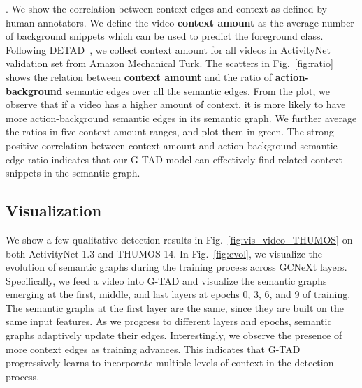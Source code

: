 \documentclass[10pt,twocolumn,letterpaper]{article}
\begin{document}
. We show the correlation between context edges and context as defined by human annotators. 
We define the video \textbf{context amount} as the average number of background snippets which can be used to predict the foreground class. 
Following DETAD~\cite{detad}, we collect context amount for all videos in ActivityNet validation set from Amazon Mechanical Turk. The scatters in Fig.~\ref{fig:ratio} shows the relation between \textbf{context amount} and 
the ratio of \textbf{action-background} semantic edges over all the semantic edges.
From the plot, we observe that if a video has a higher amount of context, it is more likely to have more action-background semantic edges in its semantic graph. We further average the ratios in five context amount ranges, and plot them in green. The strong positive correlation between {context amount} and {action-background semantic edge ratio} indicates that our G-TAD model can effectively find related context snippets in the semantic graph.


















\subsection{Visualization}
We show a few qualitative detection results in Fig.~\ref{fig:vis_video_THUMOS} on both ActivityNet-1.3 and THUMOS-14. In Fig.~\ref{fig:evol}, we visualize the evolution of semantic graphs during the training process across GCNeXt layers. Specifically, we feed a video into G-TAD and visualize the semantic graphs emerging at the first, middle, and last layers at epochs 0, 3, 6, and 9 of training. The semantic graphs at the first layer are the same, since they are built on the same input features. As we progress to different layers and epochs, semantic graphs adaptively update their edges. Interestingly, we observe the presence of more context edges as training advances. This indicates that G-TAD progressively learns to incorporate multiple levels of context in the detection process. 
\end{document}
